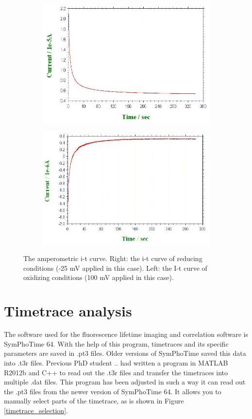 \documentclass[twoside,single]{lion-msc}
\begin{document}
\begin{figure}[ht!]
\begin{subfigure}{.5\textwidth}
  \centering
  \includegraphics[width= \textwidth]{it25mV}

  \label{}
\end{subfigure}%
\begin{subfigure}{.5\textwidth}
  \centering
  \includegraphics[width=.95 \linewidth]{it100mV}
  \label{}
\end{subfigure}
\caption{The amperometric i-t curve.  Right: the i-t curve of reducing conditions (-25 mV applied in this case). Left: the I-t curve of oxidizing conditions (100 mV applied in this case).}
\label{it_curves}
\end{figure}


\section*{Timetrace analysis}
The software used for the fluorescence lifetime imaging and correlation software is SymPhoTime 64. With the help of this program, timetraces and its specific parameters are saved in .pt3 files. Older versions of SymPhoTime saved this data into .t3r files. Previous PhD student .. had written a program in MATLAB R2012b and C++ to read out the .t3r files and transfer the timetraces into multiple .dat files. This program has been adjusted in such a way it can read out the .pt3 files from the newer version of SymPhoTime 64. It allows you to manually select parts of the timetrace, as is shown in Figure \ref{timetrace_selection}.
\end{document}
